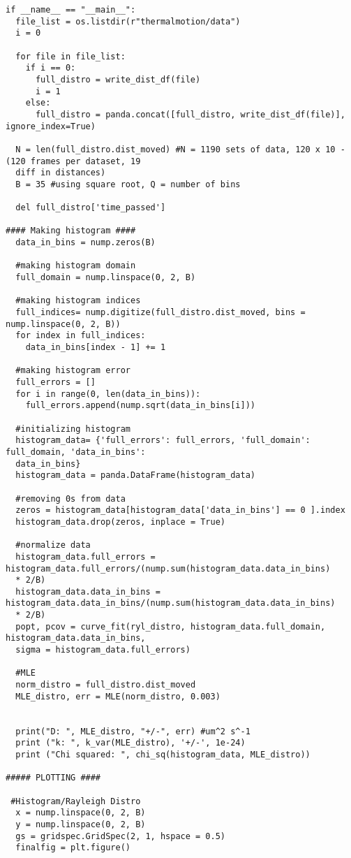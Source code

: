 \documentclass[12pt, letterpaper, twoside]{article}
\begin{document}
\begin{verbatim}
if __name__ == "__main__":
  file_list = os.listdir(r"thermalmotion/data")
  i = 0

  for file in file_list:
    if i == 0:
      full_distro = write_dist_df(file)
      i = 1
    else:
      full_distro = panda.concat([full_distro, write_dist_df(file)], ignore_index=True)

  N = len(full_distro.dist_moved) #N = 1190 sets of data, 120 x 10 -  (120 frames per dataset, 19
  diff in distances)
  B = 35 #using square root, Q = number of bins

  del full_distro['time_passed']

#### Making histogram ####
  data_in_bins = nump.zeros(B)

  #making histogram domain
  full_domain = nump.linspace(0, 2, B)

  #making histogram indices
  full_indices= nump.digitize(full_distro.dist_moved, bins = nump.linspace(0, 2, B))
  for index in full_indices:
    data_in_bins[index - 1] += 1

  #making histogram error
  full_errors = []
  for i in range(0, len(data_in_bins)):
    full_errors.append(nump.sqrt(data_in_bins[i]))

  #initializing histogram
  histogram_data= {'full_errors': full_errors, 'full_domain': full_domain, 'data_in_bins':
  data_in_bins}
  histogram_data = panda.DataFrame(histogram_data)

  #removing 0s from data 
  zeros = histogram_data[histogram_data['data_in_bins'] == 0 ].index
  histogram_data.drop(zeros, inplace = True)

  #normalize data
  histogram_data.full_errors = histogram_data.full_errors/(nump.sum(histogram_data.data_in_bins)
  * 2/B)
  histogram_data.data_in_bins = histogram_data.data_in_bins/(nump.sum(histogram_data.data_in_bins)
  * 2/B) 
  popt, pcov = curve_fit(ryl_distro, histogram_data.full_domain, histogram_data.data_in_bins,
  sigma = histogram_data.full_errors)
  
  #MLE
  norm_distro = full_distro.dist_moved
  MLE_distro, err = MLE(norm_distro, 0.003)
  

  print("D: ", MLE_distro, "+/-", err) #um^2 s^-1
  print ("k: ", k_var(MLE_distro), '+/-', 1e-24)
  print ("Chi squared: ", chi_sq(histogram_data, MLE_distro))

##### PLOTTING ####
  
 #Histogram/Rayleigh Distro
  x = nump.linspace(0, 2, B)
  y = nump.linspace(0, 2, B)
  gs = gridspec.GridSpec(2, 1, hspace = 0.5)
  finalfig = plt.figure()
  

\end{verbatim}
\end{document}
